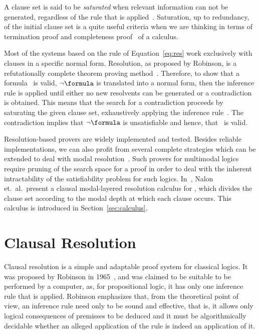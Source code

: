 A clause set is said to be \emph{saturated} when relevant information can not be
generated, regardless of the rule that is applied~\cite{dershowitz2003abstract}.
Saturation, up to redundancy, of the initial clause set is a quite useful
criteria when we are thinking in terms of
termination proof and completeness proof~\cite{fitting} of a calculus.

Most of the systems based on the rule of Equation~\ref{eq:res} work exclusively
with clauses in a specific normal form. Resolution, as proposed by Robinson, is
a refutationally complete theorem proving method~\cite{Robinson65}.  Therefore,
to show that a formula \formula~is valid, $\neg \formula$ is translated into a
normal form, then the inference rule is applied until either no new resolvents
can be generated or a contradiction is obtained. This means that the search for
a contradiction proceeds by saturating the given clause set, exhaustively
applying the inference rule~\cite{bachmair2001resolution}. The contradiction
implies that $\neg \formula$ is unsatisfiable and hence, that \formula~is valid. 

Resolution-based provers are widely implemented and tested. Besides reliable
implementations, we can also profit from several complete strategies which can
be extended to deal with modal resolution~\cite{journals/jal/NalonD07}. Such
provers for multimodal logics require pruning of the search space for a proof in
order to deal with the inherent intractability of the satisfiability problem for
such logics. In~\cite{nalon2015modal}, Nalon et.\ al.\ present a clausal
modal-layered resolution calculus for , which divides the clause
set according to the modal depth at which each clause occurs. This calculus is
introduced in Section~\ref{sec:calculus}.

\section{Clausal Resolution}

Clausal resolution is a simple and adaptable proof system for classical logics.
It was proposed by Robinson in 1965~\cite{Robinson65}, and was claimed to be
suitable to be performed by a computer, as, for propositional logic, it has only
one inference rule that is applied. Robinson emphasizes that, from the
theoretical point of view, an inference rule need only to be sound and
effective, that is, it allows only logical consequences of premisses to be
deduced and it must be algorithmically decidable whether an alleged application
of the rule is indeed an application of it.

